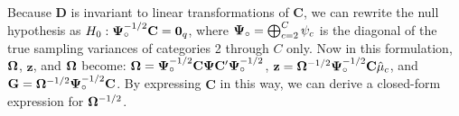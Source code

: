 




Because $\bm{D}$ is invariant to linear transformations of $\bm{C}$, we can rewrite the null hypothesis as $H_0: \boldsymbol\Psi_{\circ}^{-1/2} \mathbf{C} = \mathbf{0}_q$, where $\boldsymbol\Psi_{\circ} = \bigoplus_{c=2}^C \psi_c$ is the diagonal of the true sampling variances of categories 2 through $C$ only. Now in this formulation, $\boldsymbol\Omega$, $\bm{z}$, and $\boldsymbol\Omega$ become: $\boldsymbol\Omega = \boldsymbol\Psi_{\circ}^{-1/2} \mathbf{C} \boldsymbol\Psi \mathbf{C}'\boldsymbol\Psi_{\circ}^{-1/2}$, $\mathbf{z} = \boldsymbol\Omega^{-1/2}\boldsymbol\Psi_{\circ}^{-1/2}\mathbf{C}\hat\mu_c$, and $\mathbf{G} = \boldsymbol\Omega^{-1/2} \boldsymbol\Psi_{\circ}^{-1/2} \mathbf{C}$. By expressing $\bm{C}$ in this way, we can derive a closed-form expression for $\boldsymbol\Omega^{-1/2}$.

